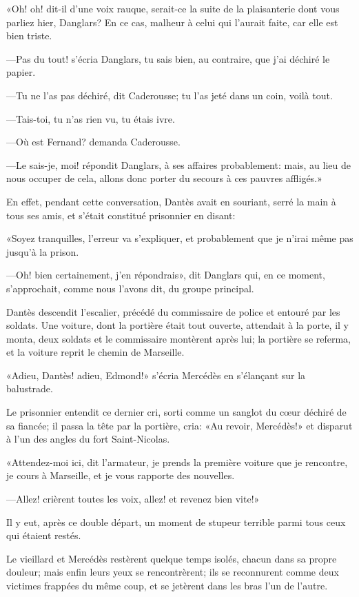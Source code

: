 «Oh! oh! dit-il d'une voix rauque, serait-ce la suite de la plaisanterie dont vous parliez hier, Danglars? En ce cas, malheur à celui qui l'aurait faite, car elle est bien triste.

—Pas du tout! s'écria Danglars, tu sais bien, au contraire, que j'ai déchiré le papier.

—Tu ne l'as pas déchiré, dit Caderousse; tu l'as jeté dans un coin, voilà tout.

—Tais-toi, tu n'as rien vu, tu étais ivre.

—Où est Fernand? demanda Caderousse.

—Le sais-je, moi! répondit Danglars, à ses affaires probablement: mais, au lieu de nous occuper de cela, allons donc porter du secours à ces pauvres affligés.»

En effet, pendant cette conversation, Dantès avait en souriant, serré la main à tous ses amis, et s'était constitué prisonnier en disant:

«Soyez tranquilles, l'erreur va s'expliquer, et probablement que je n'irai même pas jusqu'à la prison.

—Oh! bien certainement, j'en répondrais», dit Danglars qui, en ce moment, s'approchait, comme nous l'avons dit, du groupe principal.

Dantès descendit l'escalier, précédé du commissaire de police et entouré par les soldats. Une voiture, dont la portière était tout ouverte, attendait à la porte, il y monta, deux soldats et le commissaire montèrent après lui; la portière se referma, et la voiture reprit le chemin de Marseille.

«Adieu, Dantès! adieu, Edmond!» s'écria Mercédès en s'élançant sur la balustrade.

Le prisonnier entendit ce dernier cri, sorti comme un sanglot du cœur déchiré de sa fiancée; il passa la tête par la portière, cria: «Au revoir, Mercédès!» et disparut à l'un des angles du fort Saint-Nicolas.

«Attendez-moi ici, dit l'armateur, je prends la première voiture que je rencontre, je cours à Marseille, et je vous rapporte des nouvelles.

—Allez! crièrent toutes les voix, allez! et revenez bien vite!»

Il y eut, après ce double départ, un moment de stupeur terrible parmi tous ceux qui étaient restés.

Le vieillard et Mercédès restèrent quelque temps isolés, chacun dans sa propre douleur; mais enfin leurs yeux se rencontrèrent; ils se reconnurent comme deux victimes frappées du même coup, et se jetèrent dans les bras l'un de l'autre.

